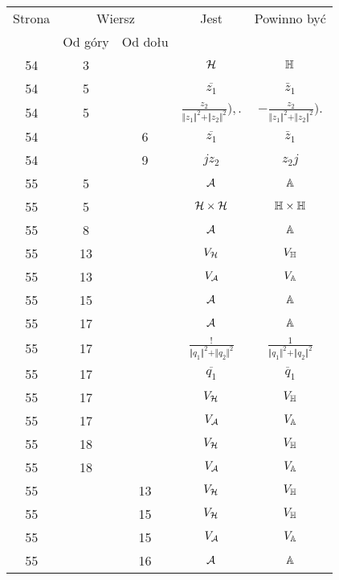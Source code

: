 \documentclass[a4paper,11pt]{article}
\begin{document}
\begin{center}
  \begin{tabular}{|c|c|c|c|c|}
    \hline
    Strona & \multicolumn{2}{c|}{Wiersz} & Jest
                              & Powinno być \\ \cline{2-3}
    & Od góry & Od dołu & & \\
    \hline
    54  & \hphantom{0}3 & & $\mathcal{H}$ & $\mathbb{H}$ \\
    54  & \hphantom{0}5 & & $\overline{ z_{ 1 } }$ & $\bar{ z }_{ 1 }$ \\
    54  & \hphantom{0}5 & & $\frac{ z_{ 2 } }
                 { \Vert z_{ 1 } \Vert^{ 2 } + \Vert z_{ 2 } \Vert^{ 2 } } ),.$
           & $-\frac{ z_{ 2 } }
             { \Vert z_{ 1 } \Vert^{ 2 } + \Vert z_{ 2 } \Vert^{ 2 } } ).$ \\
    54  & & \hphantom{0}6 & $\overline{ z_{ 1 } }$ & $\bar{ z }_{ 1 }$ \\
    54  & & \hphantom{0}9 & $j z_{ 2 }$ & $z_{ 2 } j$ \\
    55  & \hphantom{0}5 & & $\mathcal{A}$ & $\mathbb{A}$ \\
    55  & \hphantom{0}5 & & $\mathcal{H} \times \mathcal{H}$ & $\mathbb{H} \times \mathbb{H}$ \\
    55  & \hphantom{0}8 & & $\mathcal{A}$ & $\mathbb{A}$ \\
    55  & 13 & & $V_{ \mathcal{H} }$ & $V_{ \mathbb{H} }$ \\
    55  & 13 & & $V_{ \mathcal{A} }$ & $V_{ \mathbb{A} }$ \\
    55  & 15 & & $\mathcal{A}$ & $\mathbb{A}$ \\
    55  & 17 & & $\mathcal{A}$ & $\mathbb{A}$ \\
    55  & 17 & & $\frac{ ! }{ \Vert q_{ 1 } \Vert^{ 2 } + \Vert q_{ 2 } \Vert^{ 2 } }$
           & $\frac{ 1 }
             { \Vert q_{ 1 } \Vert^{ 2 } + \Vert q_{ 2 } \Vert^{ 2 } }$ \\
    55  & 17 & & $\overline{ q_{ 1 } }$ & $\overline{ q }_{ 1 }$ \\
    55  & 17 & & $V_{ \mathcal{H} }$ & $V_{ \mathbb{H} }$ \\
    55  & 17 & & $V_{ \mathcal{A} }$ & $V_{ \mathbb{A} }$ \\
    55  & 18 & & $V_{ \mathcal{H} }$ & $V_{ \mathbb{H} }$ \\
    55  & 18 & & $V_{ \mathcal{A} }$ & $V_{ \mathbb{A} }$ \\
    55  & & 13 & $V_{ \mathcal{H} }$ & $V_{ \mathbb{H} }$ \\
    55  & & 15 & $V_{ \mathcal{H} }$ & $V_{ \mathbb{H} }$ \\
    55  & & 15 & $V_{ \mathcal{A} }$ & $V_{ \mathbb{A} }$ \\
    55  & & 16 & $\mathcal{A}$ & $\mathbb{A}$ \\

\end{tabular}
\end{center}
\end{document}
